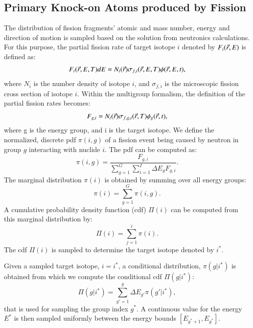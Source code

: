 \documentclass{anstrans}
\begin{document}
\subsection{Primary Knock-on Atoms produced by Fission}\label{sec:pka_pdf}
The distribution of fission fragments' atomic and mass number, energy and direction of motion is sampled based on the solution
from neutronics calculations. 
For this purpose, the partial fission rate of target isotope $i$ denoted by $F_i(\vec{r},E)$ is defined as:
\begin{equation}
    F_i(\vec{r},E, T) dE = N_i(\vec{r}) \sigma_{f,i}(\vec{r}, E, T) \phi(\vec{r}, E, t),
\end{equation}
where $N_i$ is the number density of isotope $i$, and $ \sigma_{f,i}$ is the microscopic fission cross section of isotope $i$.
Within the multigroup formalism, the definition of the partial fission rates becomes:
\begin{equation}
    F_{g,i} = N_{i}(\vec{r}) \sigma_{f,g,i}(\vec{r}, T) \phi_g(\vec{r}, t),
\end{equation}
where g is the energy group, and i is the target isotope. We define the normalized, discrete pdf $\pi(i,g)$ of a fission event being caused by neutron in  group
$g$ interacting with nuclide $i$. The pdf can be computed as:
\begin{equation}\label{eq:fission_pdf}
  \pi(i,g) = \frac{F_{g,i}}{\sum\limits_{g=1}^G \sum\limits_{i=1}^I \Delta E_g F_{g,i}}.
\end{equation}
The marginal distribution $\pi(i)$ is obtained by summing over all energy groups:
\begin{equation}
  \pi(i) = \sum\limits_{g=1}^G \pi(i,g).
\end{equation}
A cumulative probability density function (cdf) $\Pi(i)$ can be computed from this marginal distribution by:
\begin{equation}\label{eq:cdf_marg}
   \Pi(i) = \sum\limits_{j=1}^i \pi(i).
\end{equation}
The cdf $ \Pi(i)$  is sampled to determine the target isotope denoted by $i^*$.

Given a sampled target isotope, $i = i^*$, a conditional distribution, $\pi(g |  i^*)$ is obtained from which we compute the conditional cdf $\Pi(g |  i^*)$:
\begin{equation}\label{eq:cdf_cond}
  \Pi(g |  i^*) = \sum\limits_{g'=1}^g  \Delta E_{g'} \pi(g' |  i^*),
\end{equation}
that is used for sampling the group index $g^*$. A continuous value for the energy $E^*$ is then sampled uniformly between the energy bounds $[E_{g^*+1}, E_{g^*}]$.
\end{document}
